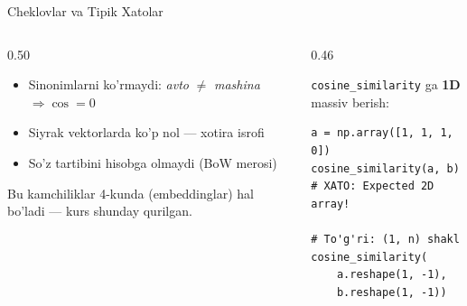 \documentclass[aspectratio=169,11pt]{beamer}
\begin{document}
\begin{frame}[fragile]{Cheklovlar va Tipik Xatolar}
  \begin{columns}
    \begin{column}{0.50\textwidth}
      \begin{tcolorbox}[warnbox,title=Usulning cheklovlari]
        \small
        \begin{itemize}\setlength\itemsep{2pt}
          \item Sinonimlarni ko'rmaydi:
                \textit{avto} $\ne$ \textit{mashina} $\Rightarrow \cos=0$
          \item Siyrak vektorlarda ko'p nol --- xotira isrofi
          \item So'z tartibini hisobga olmaydi (BoW merosi)
        \end{itemize}
      \end{tcolorbox}
      {\scriptsize\color{halfgray}Bu kamchiliklar 4-kunda
      (embeddinglar) hal bo'ladi --- kurs shunday qurilgan.}
    \end{column}
    \begin{column}{0.46\textwidth}
      \begin{tcolorbox}[warnbox,title=Tipik xato]
        \small \texttt{cosine\_similarity} ga \textbf{1D} massiv
        berish:
      \end{tcolorbox}
      \begin{lstlisting}
a = np.array([1, 1, 1, 0])
cosine_similarity(a, b)
# XATO: Expected 2D array!

# To'g'ri: (1, n) shakl
cosine_similarity(
    a.reshape(1, -1),
    b.reshape(1, -1))
      \end{lstlisting}
    \end{column}
  \end{columns}
\end{frame}
\end{document}
